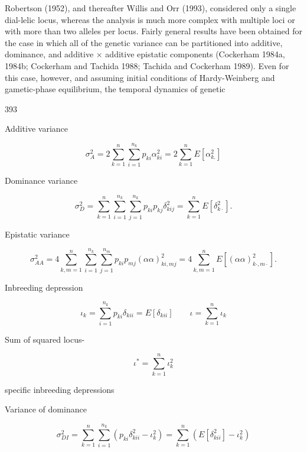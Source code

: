 \documentclass{article}
\begin{document}
Robertson (1952), and thereafter Willis and Orr (1993), considered only a single dial-lelic locus, whereas the analysis is much more complex with multiple loci or with more than two alleles per locus. Fairly general results have been obtained for the case in which all of the genetic variance can be partitioned into additive, dominance, and additive × additive epistatic components (Cockerham 1984a, 1984b; Cockerham and Tachida 1988; Tachida and Cockerham 1989). Even for this case, however, and assuming initial conditions of Hardy-Weinberg and gametic-phase equilibrium, the temporal dynamics of genetic

393

Additive variance

\begin{equation}
\sigma_{A}^{2}=2\sum_{k=1}^{n}\sum_{i=1}^{n_{k}}p_{ki}\alpha_{ki}^{2}=2\sum_{k=1}^{n}E[\alpha_{k.}^{2}]
\end{equation}

Dominance variance

\begin{equation}
\sigma_{D}^{2}=\sum_{k=1}^{n}\sum_{i=1}^{n_{k}}\sum_{j=1}^{n_{k}}p_{ki}p_{kj}\delta_{kij}^{2}=\sum_{k=1}^{n}E[\delta_{k\cdot}^{2}].
\end{equation}

Epistatic variance

\begin{equation}
\sigma_{A A}^{2}=4\sum_{k,m=1}^{n}\sum_{i=1}^{n_{k}}\sum_{j=1}^{n_{m}}p_{k i}p_{m j}(\alpha\alpha)_{k i,m j}^{2}=4\sum_{k,m=1}^{n}E[(\alpha\alpha)_{k\cdot,m\cdot}^{2}].
\end{equation}

Inbreeding depression

\begin{equation}
\iota_{k}=\sum_{i=1}^{n_{k}}p_{ki}\delta_{kii}=E[\delta_{kii}]\qquad\iota=\sum_{k=1}^{n}\iota_{k}
\end{equation}

Sum of squared locus-

\begin{equation}
\iota^{*}=\sum_{k=1}^{n}\iota_{k}^{2}
\end{equation}

specific inbreeding depressions

Variance of dominance

\begin{equation}
\sigma_{D I}^{2}=\sum_{k=1}^{n}\sum_{i=1}^{n_{k}}\left(p_{k i}\delta_{k i i}^{2}-\iota_{k}^{2}\right)=\sum_{k=1}^{n}\left(E[\delta_{k i i}^{2}]-\iota_{k}^{2}\right)
\end{equation}
\end{document}
